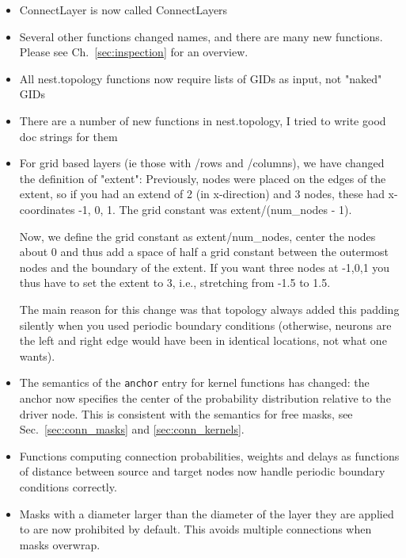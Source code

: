 \documentclass[a4paper,12pt]{report}
\begin{document}
\begin{itemize}
\item ConnectLayer is now called ConnectLayers
\item Several other functions changed names, and there are many new
  functions. Please see Ch.~\ref{sec:inspection} for an overview.
\item All nest.topology functions now require lists of GIDs as input,
  not "naked" GIDs
\item There are a number of new functions in nest.topology, I tried to
  write good doc strings for them
\item For grid based layers (ie those with /rows and /columns), we
  have changed the definition of "extent": Previously, nodes were
  placed on the edges of the extent, so if you had an extend of 2 (in
  x-direction) and 3 nodes, these had x-coordinates -1, 0, 1. The grid
  constant was extent/(num\_nodes - 1).

  Now, we define the grid constant as extent/num\_nodes, center the
  nodes about 0 and thus add a space of half a grid constant between
  the outermost nodes and the boundary of the extent. If you want
  three nodes at -1,0,1 you thus have to set the extent to 3, i.e.,
  stretching from -1.5 to 1.5.

  The main reason for this change was that topology always added this
  padding silently when you used periodic boundary conditions
  (otherwise, neurons are the left and right edge would have been in
  identical locations, not what one wants).
\item The semantics of the \lstinline!anchor! entry for kernel
  functions has changed: the anchor now specifies the center of the
  probability distribution relative to the driver node. This is
  consistent with the semantics for free masks, see
  Sec.~\ref{sec:conn_masks} and \ref{sec:conn_kernels}.
\item Functions computing connection probabilities, weights and delays
  as functions of distance between source and target nodes now handle
  periodic boundary conditions correctly.
\item Masks with a diameter larger than the diameter of the layer they
  are applied to are now prohibited by default. This avoids multiple
  connections when masks overwrap.
\end{itemize}






\listoffigures %
\listoftables  %

\printindex
\end{document}
